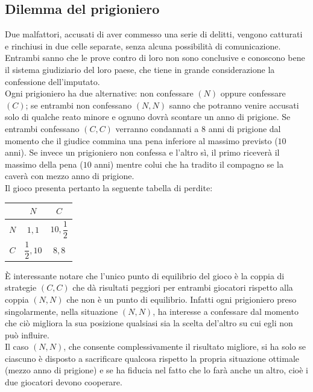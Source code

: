\documentclass[a4paper]{extarticle}
\renewcommand\arraystretch{}
\begin{document}
\vspace{1em}
\noindent
\subsection{Dilemma del prigioniero}
Due malfattori, accusati di aver commesso una serie di delitti, vengono catturati e rinchiusi in due celle separate, senza alcuna possibilità di comunicazione.\\
Entrambi sanno che le prove contro di loro non sono conclusive e conoscono bene il sistema giudiziario del loro paese, che tiene in grande considerazione la confessione dell'imputato.\\
Ogni prigioniero ha due alternative: non confessare $(N)$ oppure confessare $(C)$; se entrambi non confessano $(N,N)$ sanno che potranno venire accusati solo di qualche reato minore e ognuno dovrà scontare un anno di prigione. Se entrambi confessano $(C,C)$ verranno condannati a $8$ anni di prigione dal momento che il giudice commina una pena inferiore al massimo previsto ($10$ anni). Se invece un prigioniero non confessa e l'altro sì, il primo riceverà il massimo della pena ($10$ anni) mentre colui che ha tradito il compagno se la caverà con mezzo anno di prigione.\\
Il gioco presenta pertanto la seguente tabella di perdite:

\vspace{1em}
\noindent
\begin{table}[H]
    \setlength{\tabcolsep}{8pt}
    \renewcommand{\arraystretch}{1.5}
    \noindent
    \centering
    \begin{tabular}{|c|cc|}
        \hline
         & $N$ & $C$\\
        \hline
        $N$ & $1,1$ & $10,\dfrac{1}{2}$\\
        $C$ & $\dfrac{1}{2},10$ & $8,8$\\
        \hline
    \end{tabular}
\end{table}

\vspace{1em}
\noindent
È interessante notare che l'unico punto di equilibrio del gioco è la coppia di strategie $(C,C)$ che dà risultati peggiori per entrambi giocatori rispetto alla coppia $(N,N)$ che non è un punto di equilibrio.
Infatti ogni prigioniero preso singolarmente, nella situazione $(N,N)$, ha interesse a confessare dal momento che ciò migliora la sua posizione qualsiasi sia la scelta del'altro su cui egli non può influire.\\
Il caso $(N,N)$, che consente complessivamente il risultato migliore, si ha solo se ciascuno è disposto a sacrificare qualcosa rispetto la propria situazione ottimale (mezzo anno di prigione) e se ha fiducia nel fatto che lo farà anche un altro, cioè i due giocatori devono cooperare.
\end{document}
